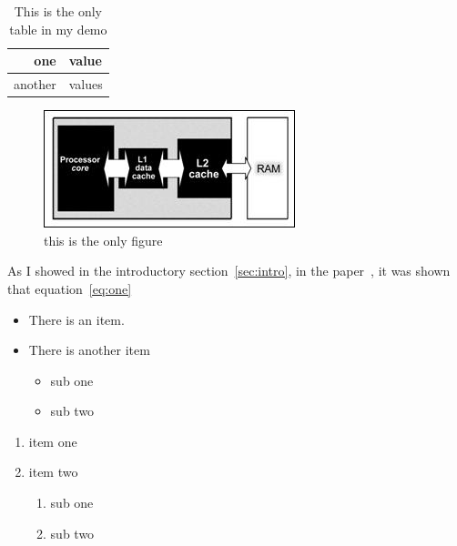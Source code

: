 \documentclass{artikel3}
\begin{document}
\begin{table}[ht]
  \centering
  \begin{tabular}{|rl|}
    \hline one&value \\ \hline another&values \\ \hline
  \end{tabular}
  \caption{This is the only table in my demo}
  \label{tab:thetable}
\end{table}
\begin{figure}[ht]
  \centering
  \includegraphics{graphics/caches}
  \caption{this is the only figure}
  \label{fig:thefigure}
\end{figure}
As I showed in the introductory section~\ref{sec:intro}, in the
paper~\cite{AdJo:colorblind}, it was shown that
equation~\eqref{eq:one}
\begin{itemize}
\item There is an item.
\item There is another item
  \begin{itemize}
  \item sub one
  \item sub two
  \end{itemize}
\end{itemize}
\begin{enumerate}
\item item one
\item item two
  \begin{enumerate}
  \item sub one
  \item sub two
  \end{enumerate}
\end{enumerate}

\tableofcontents
\listoffigures



\end{document}
